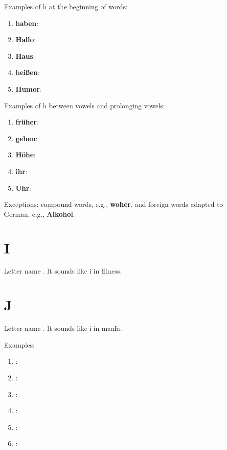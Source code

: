 Examples of h at the beginning of words:
\begin{enumerate}
    \item \textbf{haben}: \textipa{["ha:b@n]}
    \item \textbf{Hallo}: \textipa{[ha"lo:]}
    \item \textbf{Haus}: \textipa{[haUs]}
    \item \textbf{heißen}: \textipa{["haIs@n]}
    \item \textbf{Humor}: \textipa{[hu"mo:r]}
\end{enumerate}

Examples of h between vowels and prolonging vowels:
\begin{enumerate}
    \item \textbf{früher}: \textipa{["fry:@r]}
    \item \textbf{gehen}: \textipa{["ge:@n]}
    \item \textbf{Höhe}: \textipa{["h{\o}:@]}
    \item \textbf{ihr}: \textipa{[i:r]}
    \item \textbf{Uhr}: \textipa{[u:r]}
\end{enumerate}

Exceptions: compound words, e.g., \textbf{woher}, and foreign words adapted to German, e.g., \textbf{Alkohol}.

\section*{I}

Letter name \textipa{[i:]}. It sounds like i in \textbf{i}llness.

\section*{J}

Letter name \textipa{[jOt]}. It sounds like i in man\textbf{i}a.

Examples:
\begin{enumerate}
    \item \textbf{}: \textipa{[]}
    \item \textbf{}: \textipa{[]}
    \item \textbf{}: \textipa{[]}
    \item \textbf{}: \textipa{[]}
    \item \textbf{}: \textipa{[]}
    \item \textbf{}: \textipa{[]}
\end{enumerate}

